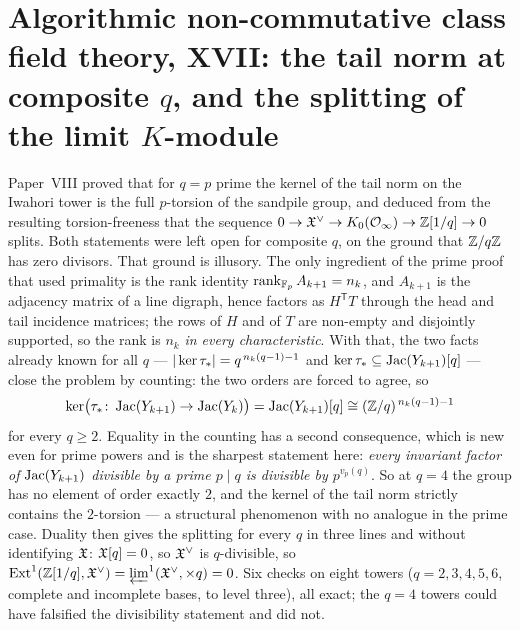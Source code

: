 \chapter[\texorpdfstring{XVII. The tail norm at composite $q$, and the splitting of the limit $K$-module}{XVII. The tail norm at composite q, and the splitting of the limit K-module}]{\texorpdfstring{Algorithmic non-commutative class field theory, XVII: the tail norm at composite $q$, and the splitting of the limit $K$-module}{Algorithmic non-commutative class field theory, XVII: the tail norm at composite q, and the splitting of the limit K-module}}\label{chap:XVII}
\begin{chapterabstract}
Paper~VIII proved that for $q=p$ prime the kernel of the tail norm on the Iwahori tower is
the full $p$-torsion of the sandpile group, and deduced from the resulting torsion-freeness
that the sequence $0\to\mathfrak{X}^\vee\to K_0(\mathcal{O}_\infty)\to\mathbb{Z}[1/q]\to0$ splits. Both statements
were left open for composite $q$, on the ground that $\mathbb{Z}/q\mathbb{Z}$ has zero divisors. That
ground is illusory. The only ingredient of the prime proof that used primality is the rank
identity $\operatorname{rank}_{\mathbb{F}_p}A_{k+1}=n_k$, and $A_{k+1}$ is the adjacency matrix of a line
digraph, hence factors as $H^{\mathsf T}T$ through the head and tail incidence matrices;
the rows of $H$ and of $T$ are non-empty and disjointly supported, so the rank is $n_k$
\emph{in every characteristic}. With that, the two facts already known for all $q$ ---
$|\ker\tau_*|=q^{\,n_k(q-1)-1}$ and $\ker\tau_*\subseteq\operatorname{Jac}(Y_{k+1})[q]$ --- close the problem
by counting: the two orders are forced to agree, so
\[
\ker\bigl(\tau_*\colon\operatorname{Jac}(Y_{k+1})\to\operatorname{Jac}(Y_k)\bigr)=\operatorname{Jac}(Y_{k+1})[q]\cong(\mathbb{Z}/q)^{\,n_k(q-1)-1}
\]
for every $q\ge2$. Equality in the counting has a second consequence, which is new even
for prime powers and is the sharpest statement here: \emph{every invariant factor of
$\operatorname{Jac}(Y_{k+1})$ divisible by a prime $p\mid q$ is divisible by $p^{v_p(q)}$}. So at
$q=4$ the group has no element of order exactly $2$, and the kernel of the tail norm
strictly contains the $2$-torsion --- a structural phenomenon with no analogue in the
prime case. Duality then gives the splitting for every $q$ in three lines and without
identifying $\mathfrak{X}$: $\mathfrak{X}[q]=0$, so $\mathfrak{X}^\vee$ is $q$-divisible, so
$\mathrm{Ext}^1(\mathbb{Z}[1/q],\mathfrak{X}^\vee)=\varprojlim^1(\mathfrak{X}^\vee,\times q)=0$. Six checks on
eight towers ($q=2,3,4,5,6$, complete and incomplete bases, to level three), all exact;
the $q=4$ towers could have falsified the divisibility statement and did not.
\end{chapterabstract}

